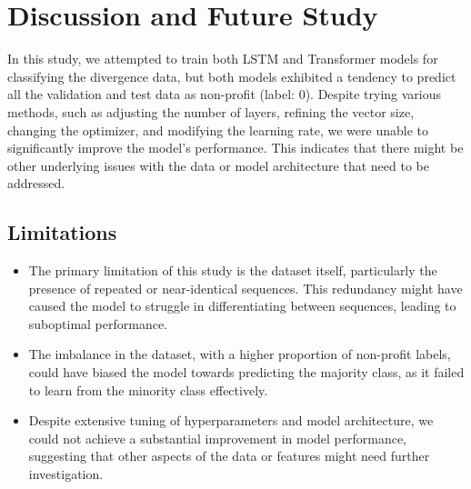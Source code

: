 \documentclass[letterpaper, 10 pt, conference]{ieeeconf}  %
\begin{document}
\section{Discussion and Future Study}

In this study, we attempted to train both LSTM and Transformer models for classifying the divergence data, but both models exhibited a tendency to predict all the validation and test data as non-profit (label: 0). Despite trying various methods, such as adjusting the number of layers, refining the vector size, changing the optimizer, and modifying the learning rate, we were unable to significantly improve the model’s performance. This indicates that there might be other underlying issues with the data or model architecture that need to be addressed.

\subsection{Limitations}
\begin{itemize}
    \item The primary limitation of this study is the dataset itself, particularly the presence of repeated or near-identical sequences. This redundancy might have caused the model to struggle in differentiating between sequences, leading to suboptimal performance.
    \item The imbalance in the dataset, with a higher proportion of non-profit labels, could have biased the model towards predicting the majority class, as it failed to learn from the minority class effectively.
    \item Despite extensive tuning of hyperparameters and model architecture, we could not achieve a substantial improvement in model performance, suggesting that other aspects of the data or features might need further investigation.
\end{itemize}
\end{document}
